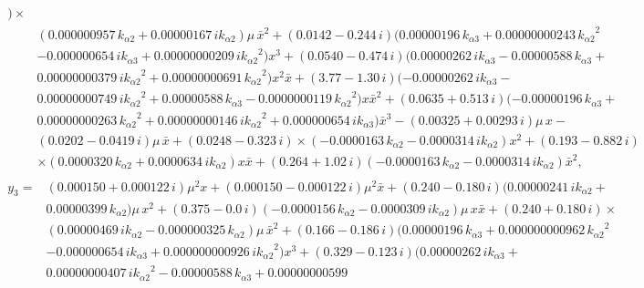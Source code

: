 \documentclass[openacc]{rsproca_new}%
\begin{document}
\begin{appendices}
\begin{align}
\begin{split}
  ) \times
  \\&(  0.000000957\,{k_{\alpha 2}}+ 0.00000167\,i{k_{\alpha 2}}
  ) \mu\,{\bar x}^{2}+ (  0.0142- 0.244\,i )  (
  0.00000196\,{k_{\alpha 3}}+ 0.00000000243\,{{k_{\alpha 2}}}^{2}\\
  &- 0.000000654\,i
  {k_{\alpha 3}}+ 0.00000000209\,i{{k_{\alpha 2}}}^{2} ) {x}^{3}+ (
  0.0540- 0.474\,i )  (  0.00000262\,i{k_{\alpha 3}}- 0.00000588
  \,{k_{\alpha 3}}+ \\
  &0.00000000379\,i{{k_{\alpha 2}}}^{2}+ 0.00000000691\,{{k_{\alpha 2}
  }}^{2} ) {x}^{2}\bar x+ (  3.77- 1.30\,i )  ( -
  0.00000262\,i{k_{\alpha 3}}- \\&0.00000000749\,i{{k_{\alpha 2}}}^{2}+0.00000588\,
  {k_{\alpha 3}}- 0.0000000119\,{{k_{\alpha 2}}}^{2} ) x{\bar x}^{2}+ (
  0.0635+ 0.513\,i )  ( - 0.00000196\,{k_{\alpha 3}}+\\&
  0.00000000263\,{{k_{\alpha 2}}}^{2}+
  0.00000000146\,i{{k_{\alpha 2}}}^{2}+
  0.000000654\,i{k_{\alpha 3}} ) {\bar x}^{3}- (  0.00325+ 0.00293\,i
  ) \mu\,x- \\&(  0.0202- 0.0419\,i ) \mu\,\bar x+(
  0.0248- 0.323\,i ) \times
   ( - 0.0000163\,{k_{\alpha 2}}- 0.0000314\,i
  {k_{\alpha 2}} ) {x}^{2}+(  0.193- 0.882\,i )\\& \times  (
  0.0000320\,{k_{\alpha 2}}+ 0.0000634\,i{k_{\alpha 2}} ) x\bar x+
   (  0.264
  + 1.02\,i )  ( - 0.0000163\,{k_{\alpha 2}}- 0.0000314\,i{k_{\alpha 2}
  } ) {\bar x}^{2},
  \end{split}
  \end{align}
  \begin{align}
  \begin{split}
  y_3=&(  0.000150+ 0.000122\,i ) {\mu}^{2}x+ (  0.000150-
  0.000122\,i ) {\mu}^{2}\bar x+ (  0.240- 0.180\,i )
  (  0.00000241\,i{  k_{\alpha 2}}+ \\&0.00000399\,{  k_{\alpha 2}} ) \mu\,{x
  }^{2}+ (  0.375- 0.0\,i )  ( - 0.0000156\,{  k_{\alpha 2}}-
  0.0000309\,i{  k_{\alpha 2}} ) \mu\,x\bar x+ (  0.240+ 0.180\,i
  ) \times \\&(  0.00000469\,i{  k_{\alpha 2}}- 0.000000325\,{  k_{\alpha 2}}
  ) \mu\,{\bar x}^{2}+ (  0.166- 0.186\,i )  (
  0.00000196\,{  k_{\alpha 3}}+ 0.000000000962\,{{  k_{\alpha 2}}}^{2}\\
  &- 0.000000654\,
  i{  k_{\alpha 3}}+ 0.000000000926\,i{{  k_{\alpha 2}}}^{2} ) {x}^{3}+ (
  0.329- 0.123\,i )  (  0.00000262\,i{  k_{\alpha 3}}+\\&
  0.00000000407\,i{{  k_{\alpha 2}}}^{2}-0.00000588\,{  k_{\alpha 3}}+ 0.00000000599

\end{split}
\end{align}
\end{appendices}
\end{document}
